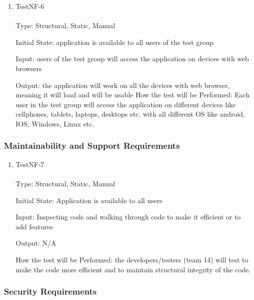 \documentclass[12pt, titlepage]{article}
\begin{document}
\begin{enumerate}

\item{TestNF-6\\\\}
Type: Structural, Static, Manual

Initial State: application is available to all users of the test group

Input: users of the test group will access the application on devices with web browsers

Output: the application will work on all the devices with web browser, meaning it will load and will be usable 
How the test will be Performed: Each user in the test group will access the application on different devices like cellphones, tablets, laptops, desktops etc. with all different OS like android, IOS, Windows, Linux etc. 

\end{enumerate}

\subsubsection{Maintainability and Support Requirements}


\begin{enumerate}

\item{TestNF-7\\\\}
Type: Structural, Static, Manual

Initial State: Application is available to all users

Input: Inspecting code and walking through code to make it efficient or to add features

Output: N/A

How the test will be Performed: the developers/testers (team 14) will test to make the code more efficient and to maintain structural integrity of the  code. 

\end{enumerate}

\subsubsection{Security Requirements}
\end{document}
